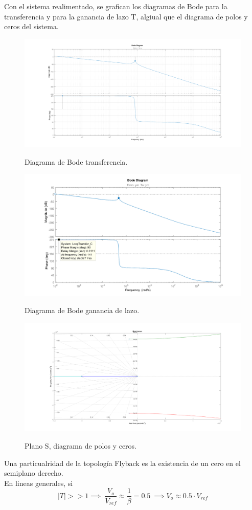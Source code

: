 Con el sistema realimentado, se grafican los diagramas de Bode para la transferencia y para la ganancia de lazo T, algiual que el diagrama de polos y ceros del sistema.
\begin{figure}[H]
	\centering
	\includegraphics[width=0.8\linewidth]{ImagenesParteIII/Bode.png}
	\label{fig:bode}
	\caption{Diagrama de Bode transferencia.}
\end{figure}
\begin{figure}[H]
	\centering
	\includegraphics[width=0.8\linewidth]{ImagenesParteIII/BodeT.png}
	\label{fig:bodeT}
	\caption{Diagrama de Bode ganancia de lazo.}
\end{figure}

\begin{figure}[H]
	\centering
	\includegraphics[width=0.8\linewidth]{ImagenesParteIII/Rlocus.png}
	\label{fig:zplane}
	\caption{Plano S, diagrama de polos y ceros.}
\end{figure}
Una particualridad de la topología Flyback es la existencia de un cero en el semiplano derecho.\\
En lineas generales, si 
\begin{equation}
|T| >> 1 \implies \ \frac{V_o}{V_{ref}} \approx \frac{1}{\beta} =  0.5 \ \implies V_o\approx 0.5 \cdot V_{ref} 
\end{equation}

